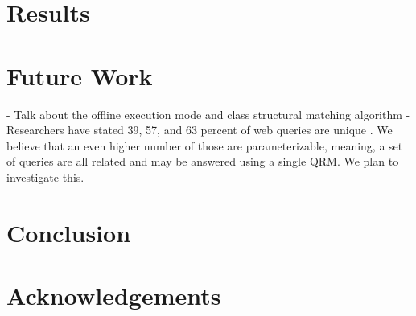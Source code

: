 \section{Results}

\section{Future Work}
- Talk about the offline execution mode and class structural matching algorithm
- Researchers have stated 39, 57, and 63 percent of web queries are unique \cite{1277770,331405,621942}.  We believe that an even higher number of those are parameterizable, meaning, a set of queries are all related and may be answered using a single QRM.  We plan to investigate this.


\section{Conclusion}

\section{Acknowledgements}
